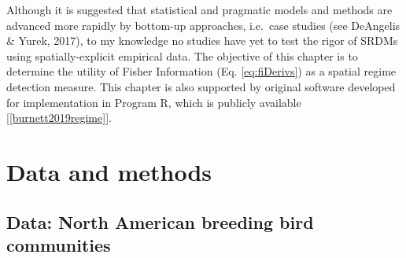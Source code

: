 \documentclass[12pt,twoside,openany]{reedthesis}
\begin{document}
Although it is suggested that statistical and pragmatic models and
methods are advanced more rapidly by bottom-up approaches, i.e.~case
studies (see DeAngelis \& Yurek, 2017), to my knowledge no studies have
yet to test the rigor of SRDMs using spatially-explicit empirical data.
The objective of this chapter is to determine the utility of Fisher
Information (Eq. \eqref{eq:fiDerivs}) as a spatial regime detection
measure. This chapter is also supported by original software developed
for implementation in Program R, which is publicly available
{[}\ref{burnett2019regime}{]}.

\section{Data and methods}\label{data-and-methods}

\subsection{Data: North American breeding bird
communities}\label{data-north-american-breeding-bird-communities}
\end{document}

